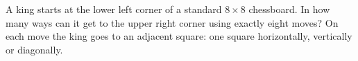 A king starts at the lower left corner of a standard $8\times8$ chessboard. In how many ways can it get to the upper right corner using exactly eight moves? On each move the king goes to an adjacent square: one square horizontally, vertically or diagonally.
